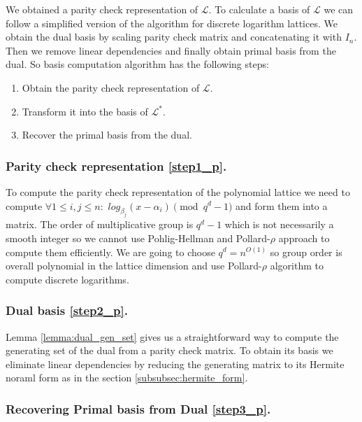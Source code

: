 \documentclass[12pt]{article}
\newcommand{\LL}{\mathcal{L}}
\begin{document}
We obtained a parity check representation of $\LL$.
To calculate a basis of $\LL$ we can follow a simplified version of the algorithm for discrete logarithm lattices. We obtain the dual basis by scaling parity check matrix and concatenating it with $I_{n}$. Then we remove linear dependencies and finally obtain primal basis from the dual. So basis computation algorithm has the following steps:

\begin{enumerate}
    \item \label{step1_p} Obtain the parity check representation of $\LL$.
    \item \label{step2_p} Transform it into the basis of $\LL^{*}$.
    \item \label{step3_p} Recover the primal basis from the dual.
\end{enumerate}

\subsubsection{Parity check representation \ref{step1_p}.}
\label{subsubsec:parity_check_polynomials}
To compute the parity check representation of the polynomial lattice we need to compute
$\forall 1 \leq i,j \leq n :$ $log_{\beta_j}(x - \alpha_i) \pmod{q^{d} -1}$ and form them into a matrix. The order of multiplicative group is $q^{d} - 1$ which is not necessarily a smooth integer so we cannot use Pohlig-Hellman \cite{[PH78]} and Pollard-$\rho$ \cite{[Pol78]} approach to compute them efficiently. We are going to choose $q^{d} = n^{O(1)}$ so group order is overall polynomial in the lattice dimension and use Pollard-$\rho$ \cite{[Pol78]} algorithm to compute discrete logarithms.

\subsubsection{Dual basis \ref{step2_p}.}
\label{subsubsec:dual_gen_set_polynomials}

Lemma \ref{lemma:dual_gen_set} gives us a straightforward way to compute the generating set of the dual from a parity check matrix. To obtain its basis we eliminate linear dependencies by reducing the generating matrix to its Hermite noraml form as in the section \ref{subsubsec:hermite_form}.

\subsubsection{Recovering Primal basis from Dual \ref{step3_p}.}
\label{subsubsec:primal_from_dual_polynomials}
\end{document}
